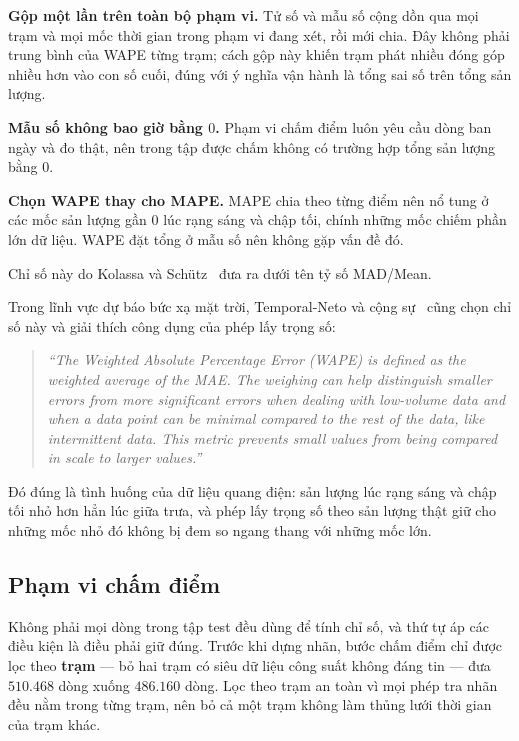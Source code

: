 \textbf{Gộp một lần trên toàn bộ phạm vi.} Tử số và mẫu số cộng dồn qua mọi trạm và mọi mốc
thời gian trong phạm vi đang xét, rồi mới chia. Đây không phải trung bình của WAPE từng trạm;
cách gộp này khiến trạm phát nhiều đóng góp nhiều hơn vào con số cuối, đúng với ý nghĩa vận
hành là tổng sai số trên tổng sản lượng.

\textbf{Mẫu số không bao giờ bằng $0$.} Phạm vi chấm điểm luôn yêu cầu dòng ban ngày và đo
thật, nên trong tập được chấm không có trường hợp tổng sản lượng bằng $0$.

\textbf{Chọn WAPE thay cho MAPE.} MAPE chia theo từng điểm nên nổ tung ở các mốc sản
lượng gần $0$ lúc rạng sáng và chập tối, chính những mốc chiếm phần lớn dữ liệu. WAPE đặt
tổng ở mẫu số nên không gặp vấn đề đó.

Chỉ số này do Kolassa và Schütz~\cite{kolassa2007mad} đưa ra dưới tên tỷ số MAD/Mean.

Trong lĩnh vực dự báo bức xạ mặt trời, Temporal-Neto và cộng sự~\cite{pin2025wape} cũng chọn
chỉ số này và giải thích công dụng của phép lấy trọng số:

\begin{quote}\small
\textit{``The Weighted Absolute Percentage Error (WAPE) is defined as the weighted average of
the MAE. The weighing can help distinguish smaller errors from more significant errors when
dealing with low-volume data and when a data point can be minimal compared to the rest of the
data, like intermittent data. This metric prevents small values from being compared in scale to
larger values.''}
\end{quote}

Đó đúng là tình huống của dữ liệu quang điện: sản lượng lúc rạng sáng và chập tối nhỏ hơn hẳn
lúc giữa trưa, và phép lấy trọng số theo sản lượng thật giữ cho những mốc nhỏ đó không bị đem so
ngang thang với những mốc lớn.


\FloatBarrier
\subsection{Phạm vi chấm điểm}

Không phải mọi dòng trong tập test đều dùng để tính chỉ số, và thứ tự áp các điều kiện là điều
phải giữ đúng. Trước khi dựng nhãn, bước chấm điểm chỉ được lọc theo \textbf{trạm} --- bỏ hai
trạm có siêu dữ liệu công suất không đáng tin --- đưa $510.468$ dòng xuống $\mathbf{486.160}$
dòng. Lọc theo trạm an toàn vì mọi phép tra nhãn đều nằm trong từng trạm, nên bỏ cả một trạm
không làm thủng lưới thời gian của trạm khác.


